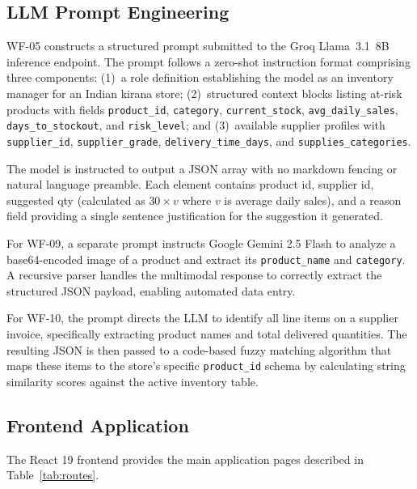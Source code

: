 \documentclass[journal]{IEEEtran}
\begin{document}
\subsection{LLM Prompt Engineering}

WF-05 constructs a structured prompt submitted to the 
Groq Llama~3.1~8B inference endpoint. The prompt 
follows a zero-shot instruction format comprising three 
components: (1)~a role definition establishing the 
model as an inventory manager for an Indian kirana store; 
(2)~structured context blocks listing at-risk products 
with fields \texttt{product\_id}, \texttt{category}, 
\texttt{current\_stock}, \texttt{avg\_daily\_sales}, 
\texttt{days\_to\_stockout}, and \texttt{risk\_level}; 
and (3)~available supplier profiles with 
\texttt{supplier\_id}, \texttt{supplier\_grade}, 
\texttt{delivery\_time\_days}, and 
\texttt{supplies\_categories}.

The model is instructed to output a JSON array 
with no markdown fencing or natural language preamble. 
Each element contains product id, 
supplier id, suggested qty
(calculated as $30 \times v$ where $v$ is average daily 
sales), and a reason field providing a 
single sentence justification for the suggestion it generated.

For WF-09, a separate prompt instructs Google Gemini 2.5 Flash to analyze a base64-encoded image of a product and extract its \texttt{product\_name} and \texttt{category}. A recursive parser handles the multimodal response to correctly extract the structured JSON payload, enabling automated data entry.

For WF-10, the prompt directs the LLM to identify all line items on a supplier invoice, specifically extracting product names and total delivered quantities. The resulting JSON is then passed to a code-based fuzzy matching algorithm that maps these items to the store's specific \texttt{product\_id} schema by calculating string similarity scores against the active inventory table.

\subsection{Frontend Application}

The React 19 frontend provides the main application pages described in Table~\ref{tab:routes}.
\end{document}
